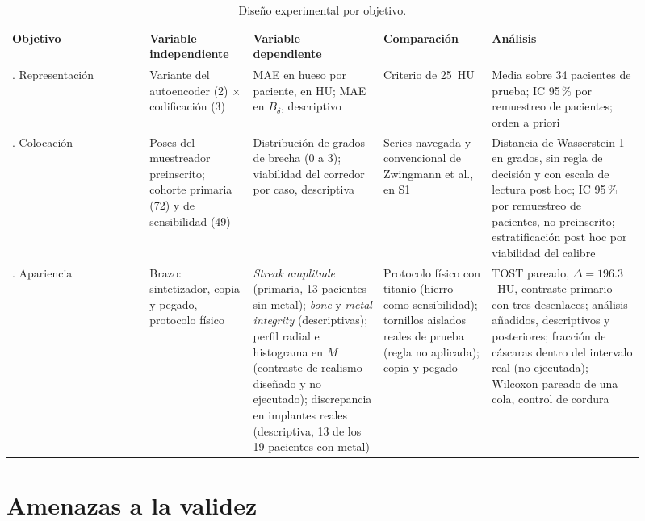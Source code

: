 \begin{table}[htbp]
\centering
\footnotesize
\caption{Diseño experimental por objetivo.}
\label{tab:diseno}
\setlength{\tabcolsep}{4pt}\renewcommand{\arraystretch}{1.1}
\begin{tabular}{>{\raggedright\arraybackslash}p{0.1965\linewidth} >{\raggedright\arraybackslash}p{0.1497\linewidth} >{\raggedright\arraybackslash}p{0.1824\linewidth} >{\raggedright\arraybackslash}p{0.1567\linewidth} >{\raggedright\arraybackslash}p{0.2199\linewidth}}
\hline
\textbf{Objetivo} & \textbf{Variable independiente} & \textbf{Variable dependiente} & \textbf{Comparación} & \textbf{Análisis} \\
\hline
1. Representación & Variante del autoencoder (2) $\times$ codificación (3) & MAE en hueso por paciente, en HU; MAE en $B_{\delta}$, descriptivo & Criterio de 25~HU & Media sobre 34 pacientes de prueba; IC 95\,\% por remuestreo de pacientes; orden a priori \\
2. Colocación & Poses del muestreador preinscrito; cohorte primaria (72) y de sensibilidad (49) & Distribución de grados de brecha (0 a 3); viabilidad del corredor por caso, descriptiva & Series navegada y convencional de Zwingmann et al., en S1 & Distancia de Wasserstein-1 en grados, sin regla de decisión y con escala de lectura post hoc; IC 95\,\% por remuestreo de pacientes, no preinscrito; estratificación post hoc por viabilidad del calibre \\
3. Apariencia & Brazo: sintetizador, copia y pegado, protocolo físico & \emph{Streak amplitude} (primaria, 13 pacientes sin metal); \emph{bone} y \emph{metal integrity} (descriptivas); perfil radial e histograma en $M$ (contraste de realismo diseñado y no ejecutado); discrepancia en implantes reales (descriptiva, 13 de los 19 pacientes con metal) & Protocolo físico con titanio (hierro como sensibilidad); tornillos aislados reales de prueba (regla no aplicada); copia y pegado & TOST pareado, $\Delta = 196.3$~HU, contraste primario con tres desenlaces; análisis añadidos, descriptivos y posteriores; fracción de cáscaras dentro del intervalo real (no ejecutada); Wilcoxon pareado de una cola, control de cordura \\
\hline
\end{tabular}
\end{table}

\section{Amenazas a la validez}\label{sec:amenazas}

